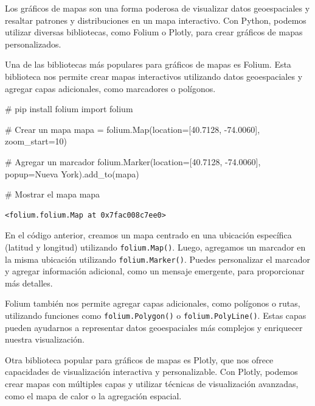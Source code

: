\documentclass[
  a4paper,
]{article}
\newenvironment{Shaded}{}{}
\newcommand{\CommentTok}[1]{\textcolor[rgb]{0.42,0.45,0.49}{#1}}
\newcommand{\DecValTok}[1]{\textcolor[rgb]{0.00,0.36,0.77}{#1}}
\newcommand{\FloatTok}[1]{\textcolor[rgb]{0.00,0.36,0.77}{#1}}
\newcommand{\ImportTok}[1]{\textcolor[rgb]{0.01,0.18,0.38}{#1}}
\newcommand{\NormalTok}[1]{\textcolor[rgb]{0.14,0.16,0.18}{#1}}
\newcommand{\OperatorTok}[1]{\textcolor[rgb]{0.14,0.16,0.18}{#1}}
\newcommand{\StringTok}[1]{\textcolor[rgb]{0.01,0.18,0.38}{#1}}
\begin{document}
Los gráficos de mapas son una forma poderosa de visualizar datos
geoespaciales y resaltar patrones y distribuciones en un mapa
interactivo. Con Python, podemos utilizar diversas bibliotecas, como
Folium o Plotly, para crear gráficos de mapas personalizados.

Una de las bibliotecas más populares para gráficos de mapas es Folium.
Esta biblioteca nos permite crear mapas interactivos utilizando datos
geoespaciales y agregar capas adicionales, como marcadores o polígonos.

\begin{Shaded}
\begin{Highlighting}[]
\CommentTok{\# pip install folium}
\ImportTok{import}\NormalTok{ folium}

\CommentTok{\# Crear un mapa}
\NormalTok{mapa }\OperatorTok{=}\NormalTok{ folium.Map(location}\OperatorTok{=}\NormalTok{[}\FloatTok{40.7128}\NormalTok{, }\OperatorTok{{-}}\FloatTok{74.0060}\NormalTok{], zoom\_start}\OperatorTok{=}\DecValTok{10}\NormalTok{)}

\CommentTok{\# Agregar un marcador}
\NormalTok{folium.Marker(location}\OperatorTok{=}\NormalTok{[}\FloatTok{40.7128}\NormalTok{, }\OperatorTok{{-}}\FloatTok{74.0060}\NormalTok{], popup}\OperatorTok{=}\StringTok{\textquotesingle{}Nueva York\textquotesingle{}}\NormalTok{).add\_to(mapa)}

\CommentTok{\# Mostrar el mapa}
\NormalTok{mapa}
\end{Highlighting}
\end{Shaded}

\begin{verbatim}
<folium.folium.Map at 0x7fac008c7ee0>
\end{verbatim}

En el código anterior, creamos un mapa centrado en una ubicación
específica (latitud y longitud) utilizando \texttt{folium.Map()}. Luego,
agregamos un marcador en la misma ubicación utilizando
\texttt{folium.Marker()}. Puedes personalizar el marcador y agregar
información adicional, como un mensaje emergente, para proporcionar más
detalles.

Folium también nos permite agregar capas adicionales, como polígonos o
rutas, utilizando funciones como \texttt{folium.Polygon()} o
\texttt{folium.PolyLine()}. Estas capas pueden ayudarnos a representar
datos geoespaciales más complejos y enriquecer nuestra visualización.

Otra biblioteca popular para gráficos de mapas es Plotly, que nos ofrece
capacidades de visualización interactiva y personalizable. Con Plotly,
podemos crear mapas con múltiples capas y utilizar técnicas de
visualización avanzadas, como el mapa de calor o la agregación espacial.
\end{document}
